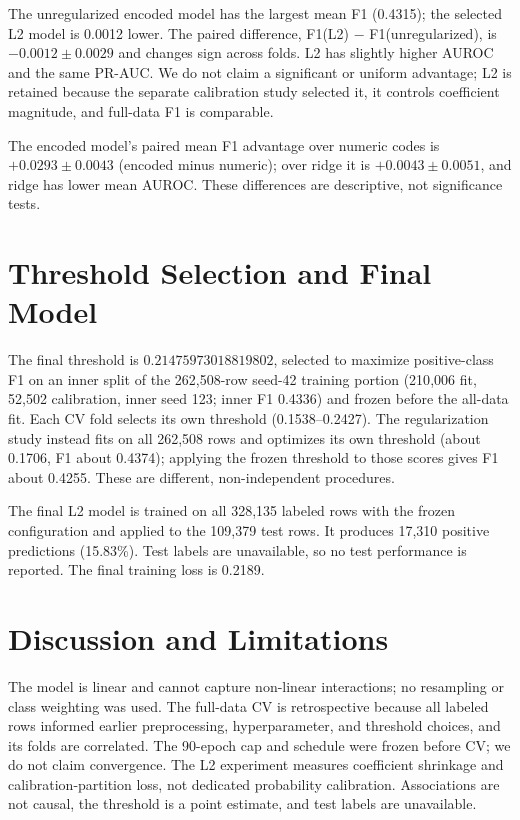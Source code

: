 \documentclass[10pt,conference,compsocconf]{IEEEtran}
\begin{document}
The unregularized encoded model has the largest mean F1 (0.4315); the selected
L2 model is 0.0012 lower. The paired difference, F1(L2) $-$ F1(unregularized),
is $-0.0012\pm0.0029$ and changes sign across folds. L2 has slightly higher
AUROC and the same PR-AUC. We do not claim a significant or uniform advantage;
L2 is retained because the separate calibration study selected it, it controls
coefficient magnitude, and full-data F1 is comparable.

The encoded model's paired mean F1 advantage over numeric codes is
$+0.0293\pm0.0043$ (encoded minus numeric); over ridge it is
$+0.0043\pm0.0051$, and ridge has lower mean AUROC. These differences are
descriptive, not significance tests.

\section{Threshold Selection and Final Model}
The final threshold is $0.21475973018819802$, selected to maximize positive-class
F1 on an inner split of the 262{,}508-row seed-42 training portion (210{,}006
fit, 52{,}502 calibration, inner seed 123; inner F1 0.4336) and frozen before
the all-data fit. Each CV
fold selects its own threshold (0.1538--0.2427). The regularization study
instead fits on all 262{,}508 rows and optimizes its own threshold (about
0.1706, F1 about 0.4374); applying the frozen threshold to those scores gives
F1 about 0.4255. These are different, non-independent procedures.

The final L2 model is trained on all 328{,}135 labeled rows with the frozen
configuration and applied to the 109{,}379 test rows. It produces 17{,}310
positive predictions (15.83\%). Test labels are unavailable, so no test
performance is reported. The final training loss is 0.2189.

\section{Discussion and Limitations}
The model is linear and cannot capture non-linear interactions; no resampling
or class weighting was used. The full-data CV is retrospective because all
labeled rows informed earlier preprocessing, hyperparameter, and threshold
choices, and its folds are correlated. The 90-epoch cap and schedule were
frozen before CV; we do not claim convergence. The L2 experiment measures
coefficient shrinkage and calibration-partition loss, not dedicated probability
calibration. Associations are not causal, the threshold is a point estimate,
and test labels are unavailable.
\end{document}
